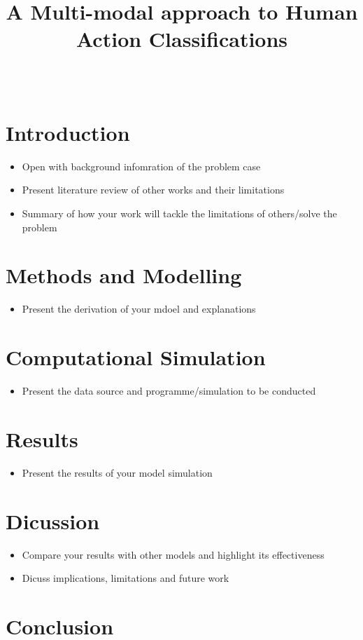\documentclass[12pt]{IEEEtran}
\begin{document}
\title{A Multi-modal approach to Human Action Classifications}

\author{ \\
}
\maketitle

\begin{abstract}

\end{abstract}

\section{Introduction}
\begin{itemize}
\item Open with background infomration of the problem case
\item Present literature review of other works and their limitations
\item Summary of how your work will tackle the limitations of others/solve the problem
\end{itemize}

\section{Methods and Modelling}
\begin{itemize}
\item Present the derivation of your mdoel and explanations
\end{itemize}
\section{Computational Simulation}
\begin{itemize}
\item Present the data source and programme/simulation to be conducted
\end{itemize}
\section{Results}
\begin{itemize}
\item Present the results of your model simulation
\end{itemize}
\section{Dicussion}
\begin{itemize}
\item Compare your results with other models and highlight its effectiveness
\item Dicuss implications, limitations and future work
\end{itemize}
\section{Conclusion}
\end{document}
